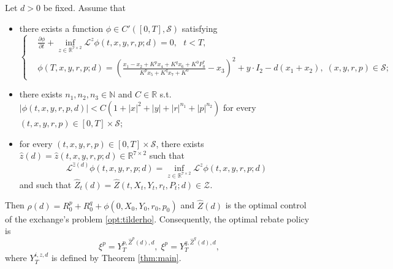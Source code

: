 \documentclass[10pt,a4paper]{amsart}
\begin{document}
\begin{theorem}\label{thm:hjb}Let $d>0$ be fixed. Assume that
        \begin{itemize}
            \item there exists a function $\phi \in C'([0,T],\mathcal{S})  $ satisfying\\
            \begin{equation}
            \left\{
            \begin{aligned}
                &\frac{\partial \phi}{\partial t} + \inf_{z\in \mathbb R^{7\times 2}} \mathcal L^z\phi(t,x,y,r,p;d) = 0,\text{ }t<T, \\
                &\phi(T,x,y,r,p;d) = \left(\frac{x_1 - x_2 + K^p x_4 + K^q x_6 + K^0 P_0^*}{K^p x_5 + K^q x_7 + K^0} - x_3\right)^2 + y \cdot I_2 - d(x_1 + x_2),\; (x,y,r,p)\in \mathcal S;
            \end{aligned}
            \right.
            \label{eq:zsolution} 
            \end{equation}
            
            \item there exists $n_1,n_2, n_3 \in \mathbb{N}$ and $C \in \mathbb{R}$ s.t. $|\phi(t,x,y,r,p,d)| < C(1+ |x|^{2}+|y|+|r|^{n_1}+|p|^{n_2})$ for every  $(t,x,y,r,p) \in [0,T] \times\mathcal{S}$;
            \item for every $(t,x,y,r,p) \in [0,T] \times \mathcal{S} $, there exists $\hat z(d)=\hat{z}(t,x,y,r,p;d) \in \mathbb{R}^{7\times 2}$ such that 
            \[
            \mathcal L^{\hat z(d)}\phi(t,x,y,r,p;d) =  \inf_{z\in \mathbb R^{7\times 2}}\mathcal L^z\phi(t,x,y,r,p;d)\] and such that $\hat Z_t(d)=\hat{Z}(t,X_t,Y_t,r_t,P_t;d) \in \mathcal{Z}$.
        \end{itemize}
        Then $\rho(d) =R_0^p  +R_0^q+ \phi(0,X_0, Y_0, r_0,p_0)$ and $\hat Z(d)$ is the optimal control of the exchange's problem \eqref{opt:tilderho}. Consequently, the optimal rebate policy is 
        \[\xi^p=Y
        _T^{p,\hat Z^p(d),d},\; \xi^p=Y
        _T^{q,\hat Z^q(d),d}, \]
        where $Y _T^{i,z,d}$ is defined by Theorem \ref{thm:main}.
\end{theorem}
\end{document}
